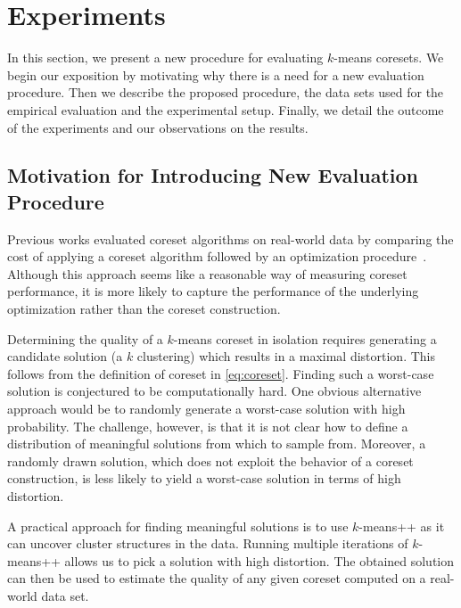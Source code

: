 


\section{Experiments} \label{sec:experiments}
In this section, we present a new procedure for evaluating $k$-means coresets. 
We begin our exposition by motivating why there is a need for a new evaluation procedure. Then we describe the proposed procedure, the data sets used for the empirical evaluation and the experimental setup. Finally, we detail the outcome of the experiments and our observations on the results.


\subsection{Motivation for Introducing New Evaluation Procedure}
Previous works evaluated coreset algorithms on real-world data by comparing the cost of applying a coreset algorithm followed by an optimization procedure~\cite{AckermannMRSLS12,FGSSS13}. Although this approach seems like a reasonable way of measuring coreset performance, it is more likely to capture the performance of the underlying optimization rather than the coreset construction.

Determining the quality of a $k$-means coreset in isolation requires generating a candidate solution (a $k$ clustering) which results in a maximal distortion. This follows from the definition of coreset in \cref{eq:coreset}. Finding such a worst-case solution is conjectured to be computationally hard. One obvious alternative approach would be to randomly generate a worst-case solution with high probability. The challenge, however, is that it is not clear how to define a distribution of meaningful solutions from which to sample from. Moreover, a randomly drawn solution, which does not exploit the behavior of a coreset construction, is less likely to yield a worst-case solution in terms of high distortion. 

A practical approach for finding meaningful solutions is to use $k$-means++ as it can uncover cluster structures in the data. Running multiple iterations of $k$-means++ allows us to pick a solution with high distortion.
The obtained solution can then be used to estimate the quality of any given coreset computed on a real-world data set.

